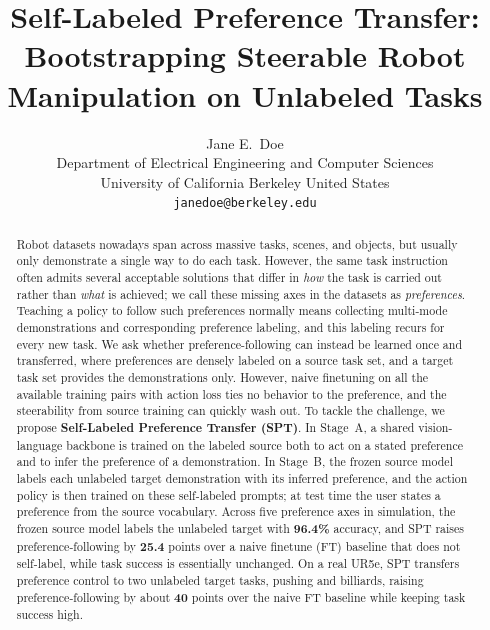 \documentclass{article}
\title{Self-Labeled Preference Transfer: Bootstrapping Steerable Robot Manipulation on Unlabeled Tasks}
\author{
  Jane E.~Doe\\
  Department of Electrical Engineering and Computer Sciences\\
  University of California Berkeley
  United States\\
  \texttt{janedoe@berkeley.edu}
}
\begin{document}
\maketitle


\begin{abstract}
Robot datasets nowadays span across massive tasks, scenes, and objects, but usually only demonstrate a single way to do each task.
However, the same task instruction often admits several acceptable solutions that differ in \emph{how} the task is carried out rather than \emph{what} is achieved; we call these missing axes in the datasets as \emph{preferences}.
Teaching a policy to follow such preferences normally means collecting multi-mode demonstrations and corresponding preference labeling, and this labeling recurs for every new task.
We ask whether preference-following can instead be learned once and transferred, where preferences are densely labeled on a source task set, and a target task set provides the demonstrations only.
However, naive finetuning on all the available training pairs with action loss ties no behavior to the preference, and the steerability from source training can quickly wash out.
To tackle the challenge, we propose \textbf{Self-Labeled Preference Transfer (SPT)}.
In Stage~A, a shared vision-language backbone is trained on the labeled source both to act on a stated preference and to infer the preference of a demonstration.
In Stage~B, the frozen source model labels each unlabeled target demonstration with its inferred preference, and the action policy is then trained on these self-labeled prompts; at test time the user states a preference from the source vocabulary.
Across five preference axes in simulation, the frozen source model labels the unlabeled target with \textbf{96.4\%} accuracy, and SPT raises preference-following by \textbf{25.4} points over a naive finetune (FT) baseline that does not self-label, while task success is essentially unchanged.
On a real UR5e, SPT transfers preference control to two unlabeled target tasks, pushing and billiards, raising preference-following by about \textbf{40} points over the naive FT baseline while keeping task success high.



\end{abstract}
\end{document}
